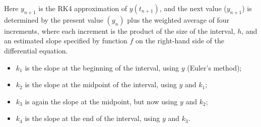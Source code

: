 \documentclass  [
  paper    = a4,
  BCOR     = 10mm,
  twoside,
  fontsize = 12pt,
  fleqn,
  toc      = bibnumbered,
  toc      = listofnumbered,
  numbers  = noendperiod,
  headings = normal,
  listof   = leveldown,
  version  = 3.03
]                                       {scrreprt}
\newcommand{\<}{\langle}
\renewcommand{\>}{\rangle}
\begin{document}
  	Here $y_{n+1}$ is the RK4 approximation of $y(t_{n+1})$, and the next value ($y_{n+1}$) is determined by the present value $(y_n)$ plus the weighted average of four increments, where each increment is the product of the size of the interval, $h$, and an estimated slope specified by function $f$ on the right-hand side of the differential equation.
  	\begin{itemize}
  		\item  $k_1$ is the slope at the beginning of the interval, using $y$  (Euler's method);
  		\item  $k_2$ is the slope at the midpoint of the interval, using $y$ and $k_1$;
  		\item  $k_3$ is again the slope at the midpoint, but now using $y$ and $k_2$;
  		\item $k_4$ is the slope at the end of the interval, using $y$ and $k_3$.
  	\end{itemize}
  	
  	
    \newpage
    {}
     \newpage
    
    
 \newpage
\end{document}
